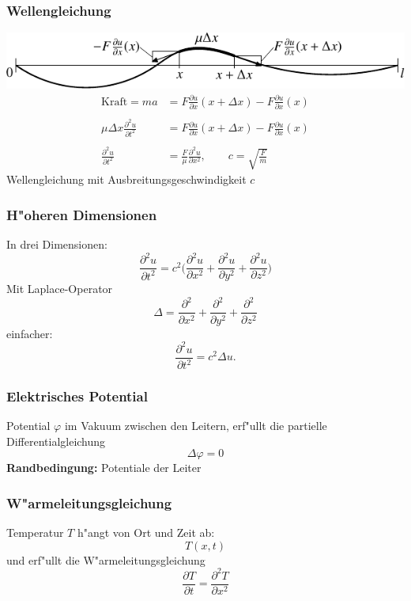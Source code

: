 \documentclass{beamer}
\begin{document}

\begin{frame}
\frametitle{Wellengleichung}
\includegraphics{../../skript/images/saite-1.pdf}
\begin{align*}
\text{Kraft}
=ma
&=
F\frac{\partial u}{\partial x}(x+\Delta x)-F\frac{\partial u}{\partial x}(x)
\\
\\
\mu \Delta x \frac{\partial^2  u}{\partial t^2}
&=
F\frac{\partial u}{\partial x}(x+\Delta x)-F\frac{\partial u}{\partial x}(x)
\\
\\
\frac{\partial^2  u}{\partial t^2}
&=
\frac{F}{\mu}
\frac{\partial^2 u}{\partial x^2},
\qquad
c=\sqrt{\frac{F}{m}}
\end{align*}
Wellengleichung mit Ausbreitungsgeschwindigkeit $c$
\end{frame}

\begin{frame}
\frametitle{H"oheren Dimensionen}
In drei Dimensionen:
\[
\frac{\partial^2 u}{\partial t^2}=c^2
\biggl(
\frac{\partial^2 u}{\partial x^2}
+
\frac{\partial^2 u}{\partial y^2}
+
\frac{\partial^2 u}{\partial z^2}
\biggr)
\]
\pause
Mit Laplace-Operator
\[
\Delta
=
\frac{\partial^2}{\partial x^2}
+
\frac{\partial^2}{\partial y^2}
+
\frac{\partial^2}{\partial z^2}
\]
\pause
einfacher:
\[
\frac{\partial^2 u}{\partial t^2}
=
c^2\Delta  u.
\]
\end{frame}


\begin{frame}
\frametitle{Elektrisches Potential}
Potential 
$\varphi$ 
im Vakuum zwischen den Leitern,
\pause
erf"ullt die partielle Differentialgleichung
\[
\Delta \varphi =0
\]
\pause
{\bf Randbedingung:} Potentiale der Leiter
\end{frame}

\begin{frame}
\frametitle{W"armeleitungsgleichung}
Temperatur $T$ h"angt von Ort und Zeit ab:
\[
T(x,t)
\]
\pause
und erf"ullt die W"armeleitungsgleichung
\[
\frac{\partial T}{\partial t}=\frac{\partial^2T}{\partial x^2}
\]
\end{frame}
\end{document}
